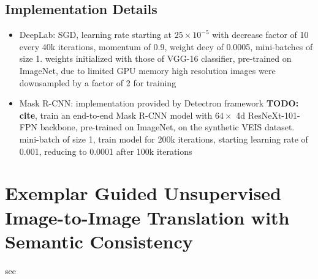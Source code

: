 \documentclass[]{article}
\newcommand{\todo}[1]{{\color{red}\bf{TODO: #1}}}
\begin{document}
\subsection{Implementation Details}
\begin{itemize}
	\item DeepLab: SGD, learning rate starting at $25 \times 10^{-5}$ with decrease factor of 10 every 40k iterations, momentum of 0.9, weight decy of 0.0005, mini-batches of size 1. weights initialized with those of VGG-16 classifier, pre-trained on ImageNet, due to limited GPU memory high resolution images were downsampled by a factor of 2 for training
	\item Mask R-CNN: implementation provided by Detectron framework \todo{cite}, train an end-to-end Mask R-CNN model with $64 \times $ 4d ResNeXt-101-FPN backbone, pre-trained on ImageNet, on the synthetic VEIS dataset. mini-batch of size 1, train model for 200k iterations, starting learning rate of 0.001, reducing to 0.0001 after 100k iterations
\end{itemize}

\section{Exemplar Guided Unsupervised Image-to-Image Translation with Semantic Consistency}

see \cite{DBLP:journals/corr/abs-1805-11145}
\end{document}
